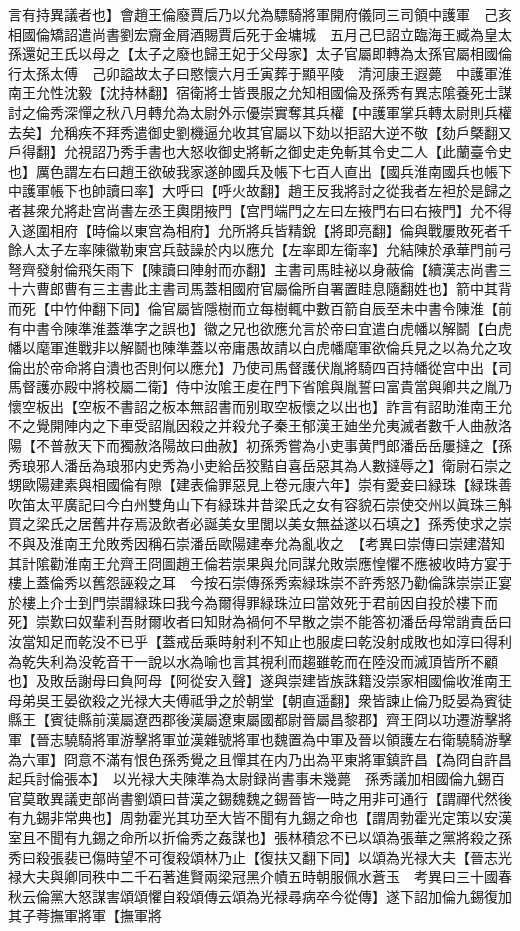 言有持異議者也】會趙王倫廢賈后乃以允為驃騎將軍開府儀同三司領中護軍　己亥相國倫矯詔遣尚書劉宏齎金屑酒賜賈后死于金墉城　五月己巳詔立臨海王臧為皇太孫還妃王氏以母之【太子之廢也歸王妃于父母家】太子官屬即轉為太孫官屬相國倫行太孫太傅　己卯謚故太子曰愍懷六月壬寅葬于顯平陵　清河康王遐薨　中護軍淮南王允性沈毅【沈持林翻】宿衛將士皆畏服之允知相國倫及孫秀有異志隂養死士謀討之倫秀深憚之秋八月轉允為太尉外示優崇實奪其兵權【中護軍掌兵轉太尉則兵權去矣】允稱疾不拜秀遣御史劉機逼允收其官屬以下劾以拒詔大逆不敬【劾戶槩翻又戶得翻】允視詔乃秀手書也大怒收御史將斬之御史走免斬其令史二人【此蘭臺令史也】厲色謂左右曰趙王欲破我家遂帥國兵及帳下七百人直出【國兵淮南國兵也帳下中護軍帳下也帥讀曰率】大呼曰【呼火故翻】趙王反我將討之從我者左袒於是歸之者甚衆允將赴宫尚書左丞王輿閉掖門【宫門端門之左曰左掖門右曰右掖門】允不得入遂圍相府【時倫以東宫為相府】允所將兵皆精銳【將即亮翻】倫與戰屢敗死者千餘人太子左率陳徽勒東宫兵鼓譟於内以應允【左率即左衛率】允結陳於承華門前弓弩齊發射倫飛矢雨下【陳讀曰陣射而亦翻】主書司馬眭袐以身蔽倫【續漢志尚書三十六曹郎曹有三主書此主書司馬蓋相國府官屬倫所自署置眭息隨翻姓也】箭中其背而死【中竹仲翻下同】倫官屬皆隱樹而立每樹輒中數百箭自辰至未中書令陳淮【前有中書令陳準淮蓋準字之誤也】徽之兄也欲應允言於帝曰宜遣白虎幡以解鬬【白虎幡以麾軍進戰非以解鬬也陳準蓋以帝庸愚故請以白虎幡麾軍欲倫兵見之以為允之攻倫出於帝命將自潰也否則何以應允】乃使司馬督護伏胤將騎四百持幡從宫中出【司馬督護亦殿中將校屬二衛】侍中汝隂王䖍在門下省隂與胤誓曰富貴當與卿共之胤乃懷空板出【空板不書詔之板本無詔書而别取空板懷之以出也】詐言有詔助淮南王允不之覺開陣内之下車受詔胤因殺之并殺允子秦王郁漢王廸坐允夷滅者數千人曲赦洛陽【不普赦天下而獨赦洛陽故曰曲赦】初孫秀嘗為小吏事黄門郎潘岳岳屢撻之【孫秀琅邪人潘岳為琅邪内史秀為小吏給岳狡黠自喜岳惡其為人數撻辱之】衛尉石崇之甥歐陽建素與相國倫有隙【建表倫罪惡見上卷元康六年】崇有愛妾曰緑珠【緑珠善吹笛太平廣記曰今白州雙角山下有緑珠井昔梁氏之女有容貌石崇使交州以眞珠三斛買之梁氏之居舊井存焉汲飲者必誕美女里閭以美女無益遂以石填之】孫秀使求之崇不與及淮南王允敗秀因稱石崇潘岳歐陽建奉允為亂收之　【考異曰崇傳曰崇建潜知其計隂勸淮南王允齊王冏圖趙王倫若崇果與允同謀允敗崇應惶懼不應被收時方宴于樓上蓋倫秀以舊怨誣殺之耳　今按石崇傳孫秀索緑珠崇不許秀怒乃勸倫誅崇崇正宴於樓上介士到門崇謂緑珠曰我今為爾得罪緑珠泣曰當效死于君前因自投於樓下而死】崇歎曰奴輩利吾財爾收者曰知財為禍何不早散之崇不能答初潘岳母常誚責岳曰汝當知足而乾没不已乎【蓋戒岳乘時射利不知止也服䖍曰乾没射成敗也如淳曰得利為乾失利為没乾音干一說以水為喻也言其視利而趨雖乾而在陸没而滅頂皆所不顧也】及敗岳謝母曰負阿母【阿從安入聲】遂與崇建皆族誅籍没崇家相國倫收淮南王母弟吳王晏欲殺之光禄大夫傅祗爭之於朝堂【朝直遥翻】衆皆諫止倫乃貶晏為賓徒縣王【賓徒縣前漢屬遼西郡後漢屬遼東屬國都尉晉屬昌黎郡】齊王冏以功遷游擊將軍【晉志驍騎將軍游擊將軍並漢雜號將軍也魏置為中軍及晉以領護左右衛驍騎游擊為六軍】冏意不滿有恨色孫秀覺之且憚其在内乃出為平東將軍鎮許昌【為冏自許昌起兵討倫張本】　以光禄大夫陳準為太尉録尚書事未幾薨　孫秀議加相國倫九錫百官莫敢異議吏部尚書劉頌曰昔漢之錫魏魏之錫晉皆一時之用非可通行【謂禪代然後有九錫非常典也】周勃霍光其功至大皆不聞有九錫之命也【謂周勃霍光定策以安漢室且不聞有九錫之命所以折倫秀之姦謀也】張林積忿不已以頌為張華之黨將殺之孫秀曰殺張裴已傷時望不可復殺頌林乃止【復扶又翻下同】以頌為光禄大夫【晉志光禄大夫與卿同秩中二千石著進賢兩梁冠黑介幘五時朝服佩水蒼玉　考異曰三十國春秋云倫黨大怒謀害頌頌懼自殺頌傳云頌為光禄尋病卒今從傳】遂下詔加倫九錫復加其子荂撫軍將軍【撫軍將